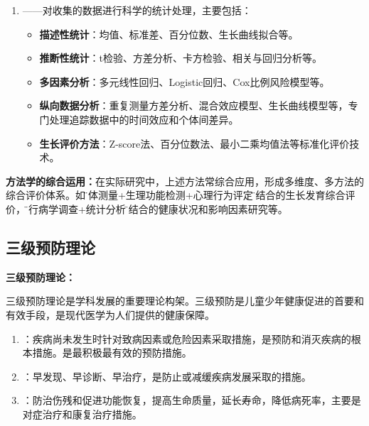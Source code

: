 \begin{defbox}
\begin{enumerate}[leftmargin=*]
    \item {}——对收集的数据进行科学的统计处理，主要包括：
        \begin{itemize}
            \item \textbf{描述性统计}：均值、标准差、百分位数、生长曲线拟合等。
            \item \textbf{推断性统计}：t检验、方差分析、卡方检验、相关与回归分析等。
            \item \textbf{多因素分析}：多元线性回归、Logistic回归、Cox比例风险模型等。
            \item \textbf{纵向数据分析}：重复测量方差分析、混合效应模型、生长曲线模型等，专门处理追踪数据中的时间效应和个体间差异。
            \item \textbf{生长评价方法}：Z-score法、百分位数法、最小二乘均值法等标准化评价技术。
        \end{itemize}
\end{enumerate}

\textbf{方法学的综合运用：}在实际研究中，上述方法常综合应用，形成多维度、多方法的综合评价体系。如\"人体测量+生理功能检测+心理行为评定\"相结合的生长发育综合评价，\"流行病学调查+统计分析\"相结合的健康状况和影响因素研究等。
\end{defbox}

\subsection{三级预防理论}

\begin{keybox}
\textbf{三级预防理论：}

三级预防理论是学科发展的重要理论构架。三级预防是儿童少年健康促进的首要和有效手段，是现代医学为人们提供的健康保障。

\begin{enumerate}[leftmargin=*]
    \item {}：疾病尚未发生时针对致病因素或危险因素采取措施，是预防和消灭疾病的根本措施。是最积极最有效的预防措施。

    \item {}：早发现、早诊断、早治疗，是防止或减缓疾病发展采取的措施。

    \item {}：防治伤残和促进功能恢复，提高生命质量，延长寿命，降低病死率，主要是对症治疗和康复治疗措施。
\end{enumerate}
\end{keybox}

